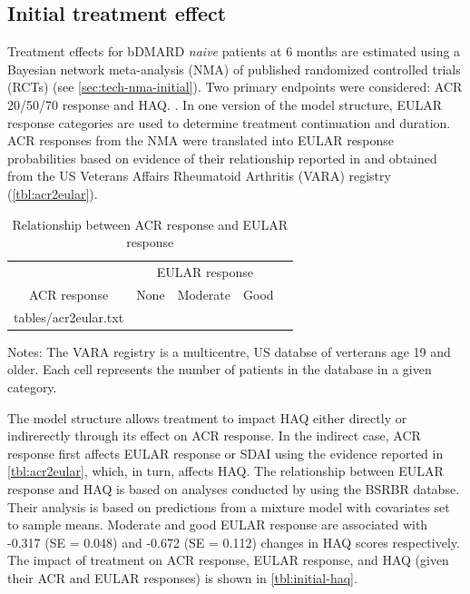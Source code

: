 \documentclass[11pt,final,fleqn]{article}\usepackage[]{graphicx}\usepackage[]{color}
\makeatletter
\theoremstyle{plain}
\newcommand*\ExpandableInput[1]{\@@input#1 }
\makeatother
\begin{document}
\subsection{Initial treatment effect}\label{initial-treatment-effect}

Treatment effects for bDMARD \emph{naive} patients at 6 months are
estimated using a Bayesian network meta-analysis (NMA) of published
randomized controlled trials (RCTs) (see \autoref{sec:tech-nma-initial}).
Two primary endpoints were considered: ACR 20/50/70 response and HAQ.
. In one version of the model
structure, EULAR response categories are used to determine treatment
continuation and duration. ACR responses from the NMA were translated
into EULAR response probabilities based on evidence of their
relationship reported in \citet{stevenson2016adalimumab} and obtained
from the US Veterans Affairs Rheumatoid Arthritis (VARA) registry
(\autoref{tbl:acr2eular}).



\begin{table}[!ht]
\begin{center}
\begin{threeparttable}
\caption{Relationship between ACR response and EULAR response} \label{tbl:acr2eular}
\begin{tabularx}{\textwidth}{@{\extracolsep{\fill}}lcccc}
\hline
\multicolumn{1}{l}{} & \multicolumn{3}{c}{EULAR response} \\
\cmidrule{2-4} 
\multicolumn{1}{c}{ACR response} & \multicolumn{1}{c}{None} & \multicolumn{1}{c}{Moderate} & \multicolumn{1}{c}{Good} \\
\hline
\ExpandableInput{tables/acr2eular.txt}
\hline
\end{tabularx}
\scriptsize
Notes: The VARA registry is a multicentre, US databse of verterans age 19 and older. Each cell represents the number of patients in the 
database in a given category. 
\end{threeparttable}
\end{center}
\end{table}



The model structure allows treatment to impact HAQ either directly or indirerectly through its effect on ACR response. In the indirect case, ACR response first affects EULAR response or SDAI using the evidence reported in \autoref{tbl:acr2eular}, which, in turn, affects HAQ. The relationship between EULAR response and HAQ is based on analyses conducted by \citet{stevenson2016adalimumab} using the BSRBR databse. Their analysis is based on predictions from a mixture model with covariates set to sample means. Moderate and good EULAR response are associated with -0.317 (SE = 0.048) and -0.672 (SE = 0.112) changes in HAQ scores respectively. The impact of treatment on ACR response, EULAR response, and HAQ (given their ACR and EULAR responses) is shown in \autoref{tbl:initial-haq}.
\end{document}
